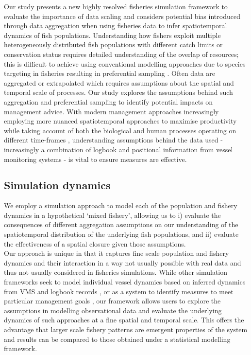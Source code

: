 \documentclass[review]{elsarticle}
\begin{document}
Our study presents a new highly resolved fisheries simulation framework to
evaluate the importance of data scaling and considers potential bias introduced
through data aggregation when using fisheries data to infer spatiotemporal
dynamics of fish populations. Understanding how fishers exploit multiple
heterogeneously distributed fish populations with different catch limits or
conservation status requires detailed understanding of the overlap of
resources; this is difficult to achieve using conventional modelling approaches
due to species targeting in fisheries resulting in preferential sampling
\citep{Martinez-Minaya2018}. Often data are aggregated or extrapolated which
requires assumptions about the spatial and temporal scale of processes. Our
study explores the assumptions behind such aggregation and preferential
sampling to identify potential impacts on management advice. With modern
management approaches increasingly employing more nuanced spatiotemporal
approaches to maximise productivity while taking account of both the biological
and human processes operating on different time-frames \citep{Dunn2016},
understanding assumptions behind the data used - increasingly a combination of
logbook and positional information from vessel monitoring systems - is vital to
ensure measures are effective. \\

\subsection{Simulation dynamics}
 
We employ a simulation approach to model each of the population and fishery
dynamics in a hypothetical `mixed fishery', allowing us to i) evaluate the
consequences of different aggregation assumptions on our understanding of the
spatiotemporal distribution of the underlying fish populations, and ii)
evaluate the effectiveness of a spatial closure given those assumptions. \\

Our approach is unique in that it captures fine scale population and fishery
dynamics and their interaction in a way not usually possible with real data and
thus not usually considered in fisheries simulations. While other simulation
frameworks seek to model individual vessel dynamics based on inferred dynamics
from VMS and logbook records \citep{Bastardie2010}, or as a system to identify
measures to meet particular management goals \citep{Bailey2018}, our framework
allows users to explore the assumptions in modelling observational data and
evaluate the underlying dynamics of such approaches at a fine spatial and
temporal scale.  This offers the advantage that larger scale fishery patterns
are emergent properties of the system and results can be compared to those
obtained under a statistical modelling framework. \\
\end{document}
